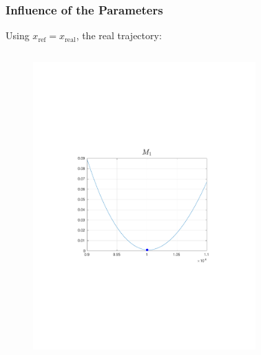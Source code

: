 \documentclass{beamer}
\begin{document}
\begin{frame}
    \frametitle{Influence of the Parameters}
    Using $x_{\text{ref}} = x_{\text{real}}$, the real trajectory:
    \begin{columns}[t]
        \begin{figure}
            \centering
            \includegraphics[trim=4cm 4cm 4cm 8cm, clip=true, width=\linewidth]{img/MassActualComp}
        \end{figure}
        \begin{figure}
            \centering

\end{figure}
\end{columns}
\end{frame}
\end{document}
